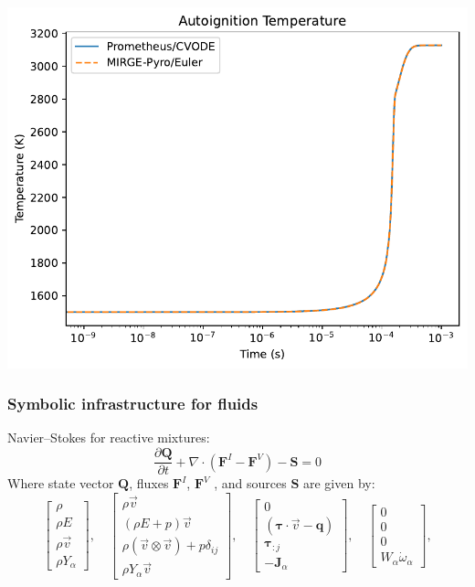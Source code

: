 \begin{frame}
\begin{multicols}{2}
\includegraphics[width=.4\textwidth]{figures/autoignition_temperature.pdf}
\end{multicols}
\end{frame}

\begin{frame}\frametitle{Symbolic infrastructure for fluids}
  \begin{center}
  Navier--Stokes for reactive mixtures:
  \begin{equation*}
    \frac{\partial\mathbf{Q}}{\partial{t}} + \nabla \cdot (\mathbf{F}^I - \mathbf{F}^V) - \mathbf{S} = 0
  \end{equation*}
    Where state vector $\mathbf{Q}$, fluxes $\mathbf{F}^I$, $\mathbf{F}^V$ , and sources $\mathbf{S}$ are given by:
 \begin{equation*}
      \begin{bmatrix}
        \rho\\\rho{E}\\\rho\vec{v}\\\rho{Y}_\alpha\end{bmatrix},\quad
      \begin{bmatrix} \rho\vec{v}\\(\rho{E} +
        p)\vec{v}\\\rho(\vec{v} \otimes \vec{v}) +
        p\delta_{ij}\\\rho{Y}_\alpha\vec{v}\end{bmatrix}, \quad
       \begin{bmatrix} 0\\(\mathbf{\tau} \cdot \vec{v} - \mathbf{q})\\\mathbf{\tau}_{:j}\\-\mathbf{J}_\alpha\end{bmatrix},\quad
       \begin{bmatrix} 0\\0\\0\\W_\alpha\dot{\omega}_\alpha\end{bmatrix},

\end{equation*}
\end{center}
\end{frame}
